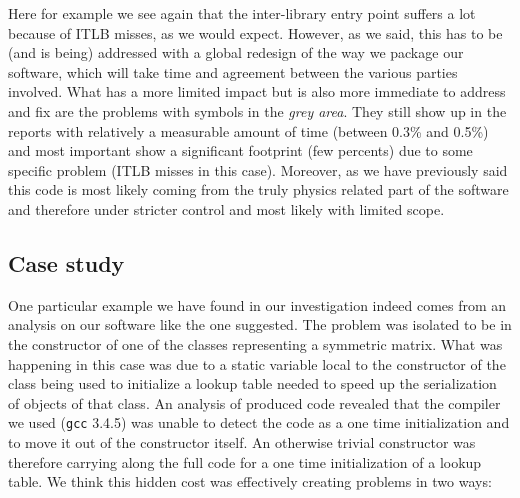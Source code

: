 \documentclass[a4paper]{jpconf}
\begin{document}
\begin{figure}
\caption{}
\label{}
\begin{center}
\end{center}
\end{figure}



Here for example we see again that the inter-library entry point suffers a lot because of ITLB misses, as we would expect. However, as we said, this has to be (and is being) addressed with a global redesign of the way we package our software, which will take time and agreement between the various parties involved.
What has a more limited impact but is also more immediate to address and fix are the problems with symbols in the {\itshape grey area}. They still show up in the reports with relatively a measurable amount of time (between 0.3\% and 0.5\%) and most important show a significant footprint (few percents) due to some specific problem (ITLB misses in this case). Moreover, as we have previously said this code is most likely coming from the truly physics related part of the software and therefore under stricter control and most likely with limited scope.


\subsection{Case study}
\label{casestudy}

One particular example we have found in our investigation indeed comes from an analysis on our software like the one suggested. The problem was isolated to be in the constructor of one of the classes representing a symmetric matrix. What was happening in this case was due to a static variable local to the constructor of the class being used to initialize a lookup table needed to speed up the serialization of objects of that class. An analysis of produced code revealed that the compiler we used (\texttt{gcc} 3.4.5) was unable to detect the code as a one time initialization and to move it out of the constructor itself. An otherwise trivial constructor was therefore carrying along the full code for a one time initialization of a lookup table. We think this hidden cost was effectively creating problems in two ways:
\end{document}
